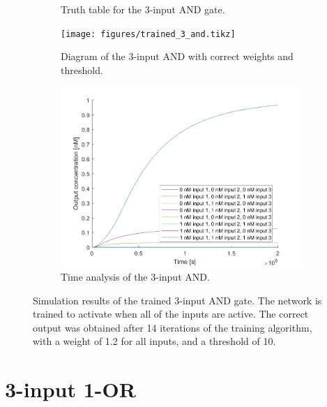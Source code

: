 \begin{figure}[H]
\begin{subfigure}[t]{.49\columnwidth}
\begin{adjustbox}{width=\textwidth}
\begin{tabular}[b]{cccc}
    \hline
    \end{tabular}
  \end{adjustbox}
    \caption{Truth table for the 3-input AND gate.}
\end{subfigure}
\begin{subfigure}[t]{.49\textwidth}
  \texttt{[image: figures/trained\_3\_and.tikz]}
  \caption{Diagram of the 3-input AND with correct weights and threshold.}
\end{subfigure}
\hfill
\begin{subfigure}[t]{\textwidth}
  \centering
\includegraphics[width=\textwidth]{images/and_simulation_3input.png}
\caption{Time analysis of the 3-input AND.}
\end{subfigure}
\caption{Simulation results of the trained 3-input AND gate. The network is trained to activate when all of the inputs are active. The correct output was obtained after 14 iterations of the training algorithm, with a weight of 1.2 for all inputs, and a threshold of 10.}
\label{3_and}
\end{figure}

\section{3-input 1-OR}

